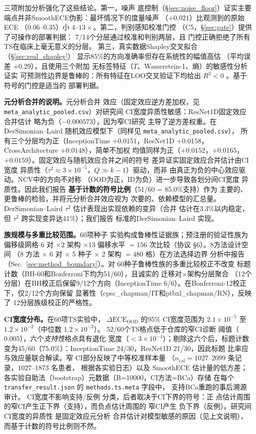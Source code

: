 三项附加分析强化了这些结论。第一，噪声
底控制（\S\ref{sec:noise_floor}）证实主要
端点并非SmoothECE伪影：最坏情况下的度量噪声
（$+0.021$）比观测到的原始ECE
（$0.06$--$0.35$）小 $4$--$13\times$。第二，判别感知校准门控
（C5，\S\ref{sec:gate}）提供了可操作的部署判据：
7/14个分层通过校准和判别两层，且
门控正确拒绝了所有TS在临床上毫无意义的分层。
第三，真实数据Shapley交叉拟合（\S\ref{sec:real_shapley}）
显示85\%的方向准确率但存在系统性的幅值高估
（平均误差 $+0.29$），且使用三个附加
无标签特征（$T$、Wasserstein-1、熵）的敏感性分析证实
可预测性边界是鲁棒的：所有特征在LOO交叉验证下均给出 $R^2 < 0$
。基于符号的门控是适当的
部署判据。

\textbf{元分析合并的说明。}元分析合并
效应（固定效应逆方差加权，见
\texttt{meta\_analytic\_pooled.csv}）对研究间
CI宽度异质性敏感：ResNet1D固定效应合并估计
略为负（$-0.000573$），因为窄CI研究
主导了逆方差权重。在DerSimonian--Laird
随机效应模型下（同样见 \texttt{meta\_analytic\_pooled.csv}），
所有三个分层均为正（InceptionTime $+0.0151$，ResNet1D
$+0.0158$，CrossArchitecture $+0.0148$），简单不加权
均值同样为正（$+0.0152$，$+0.0165$，$+0.0159$）。固定效应与随机效应合并之间的符号
差异证实固定效应合并估计由CI宽度
异质性（$\tau^2 \approx 3\times10^{-5}$，$Q \gg k-1$）驱动，而非
由真正为负的中心效应驱动。NCV中的方向不对称
（OOD为正，ID为负）进一步导致各划分间CI宽度
异质性。因此我们报告
\textbf{基于计数的符号比例}（51/60 = 85.0\%支持）作为
主要的、更鲁棒的检验，并将元分析合并效应视为
次要的、依赖模型的汇总量。DerSimonian--Laird
$\tau^2$ 估计表现出实现依赖的变异（合并
估计在3.3\%以内稳定，但 $\tau^2$ 跨实现变异达41\%）；我们报告
标准的DerSimonian--Laird
实现。

\textbf{族规模与多重比较范围。}60项种子
实验构成鲁棒性证据族；预注册的验证性族为偏移级网格
$6$ 对 $\times 2$ 架构 $\times 13$ 偏移水平 $=156$
次比较（协议 \S6）。8方法设计空间
（$8$ 方法 $\times$ 6 对 $\times$ 5 种子 $\times$ 2 架构
$=480$ 格）在方法选择边界
分析中报告（Sec.~\ref{sec:method_boundary}）。对
60种子鲁棒性族的多重比较校正不改变
标题计数（BH-60和Bonferroni下均为51/60），且诚实的
迁移对$\times$架构分层聚合
（12个分层）在BH校正后保留9/12个方向（InceptionTime
6/6）。在Bonferroni-12校正下，仅2/12个方向保留
显著性（cpsc\_chapman/IT和ptbxl\_chapman/RN），反映了
12分层族级校正的严格性。

\textbf{CI宽度分布。}在60项TS实验中，
$\Delta\text{ECE}_{\text{OOD}}$ 的95\% CI宽度范围为
$2.1\times10^{-5}$ 至 $1.2\times10^{-2}$（中位数 $1.2\times10^{-3}$）。
52/60个TS格点低于仓库的窄CI诊断
阈值（$0.005$），六个\emph{支持性}格点具有退化
宽度（$<3\times10^{-4}$）；剔除这六个后，标题计数
变为45/60（75.0\%）：InceptionTime 24/30，ResNet1D 21/30，因此标题
比率应与效应量联合解读。窄
CI部分反映了中等校准样本量
（$n_{\text{cal}} = 1027$--$2099$ 条记录，$1027$--$1873$ 名患者，
根据各实验日志）以及
SmoothECE
估计量的低方差；各实验自助法（bootstrap）元数据（B=10000，CI方法=BCa）存储
在每个 \texttt{transfer\_result.json} 的 \texttt{methods.ts.meta} 字段中，
支持BCa重跑的事后溯源审计。
CI宽度不影响支持/反例
分类，后者取决于CI下界的符号：正
点估计周围的窄CI产生正下界（支持），而负点估计周围的
窄CI产生
负下界（反例）。研究间CI宽度的异质性
是固定效应元分析
合并估计对模型敏感的原因（见上文说明），而基于计数的符号比例则不然。

